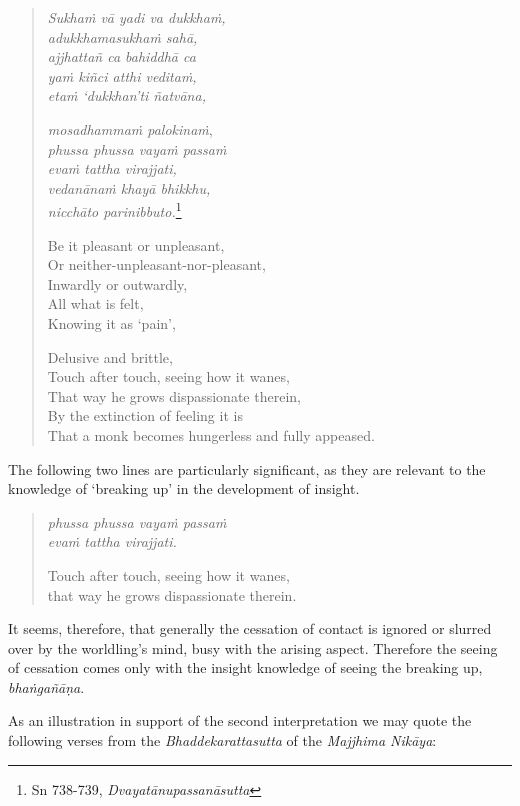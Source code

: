 \begin{quote}
\emph{Sukhaṁ vā yadi va dukkhaṁ,}\\
\emph{adukkhamasukhaṁ sahā,}\\
\emph{ajjhattañ ca bahiddhā ca}\\
\emph{yaṁ kiñci atthi veditaṁ,}\\
\emph{etaṁ `dukkhan'ti ñatvāna,}

\emph{mosadhammaṁ palokinaṁ},\\
\emph{phussa phussa vayaṁ passaṁ}\\
\emph{evaṁ tattha virajjati,}\\
\emph{vedanānaṁ khayā bhikkhu,}\\
\emph{nicchāto parinibbuto.}\footnote{Sn 738-739, \emph{Dvayatānupassanāsutta}}

Be it pleasant or unpleasant,\\
Or neither-unpleasant-nor-pleasant,\\
Inwardly or outwardly,\\
All what is felt,\\
Knowing it as `pain',

Delusive and brittle,\\
Touch after touch, seeing how it wanes,\\
That way he grows dispassionate therein,\\
By the extinction of feeling it is\\
That a monk becomes hungerless and fully appeased.
\end{quote}

The following two lines are particularly significant, as they are relevant to the knowledge of `breaking up' in the development of insight.

\begin{quote}
\emph{phussa phussa vayaṁ passaṁ}\\
\emph{evaṁ tattha virajjati.}

Touch after touch, seeing how it wanes,\\
that way he grows dispassionate therein.
\end{quote}

It seems, therefore, that generally the cessation of contact is ignored or slurred over by the worldling's mind, busy with the arising aspect. Therefore the seeing of cessation comes only with the insight knowledge of seeing the breaking up, \emph{bhaṅgañāṇa}.

As an illustration in support of the second interpretation we may quote the following verses from the \emph{Bhaddekarattasutta} of the \emph{Majjhima Nikāya}:

